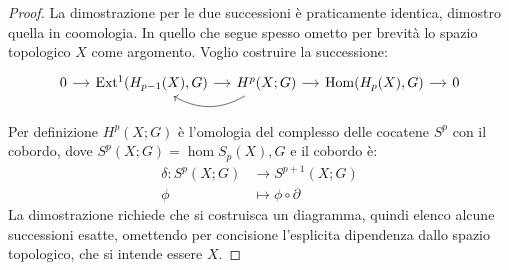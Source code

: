 \begin{proof}
  La dimostrazione per le due successioni è praticamente identica, dimostro
  quella in coomologia. In quello che segue spesso ometto per brevità lo spazio
  topologico $ X $ come argomento. Voglio costruire la successione:
  \[
    \begin{tikzcd}[nodes = {column sep = 12 pt}]
      0 \rar & \ext{H_{p-1}(X), G} \rar & \arrow[bend left]{l}{} H^p(X;G) \rar & \hom{H_p(X), G} \rar & 0
    \end{tikzcd}
  \]
  Per definizione $ H^p(X;G) $ è l'omologia del complesso delle cocatene $ S^p $ con il cobordo,
  dove $ S^p(X;G) = \hom{S_p(X), G} $ e il cobordo è:
  \begin{align*}
    \delta \colon S^p(X;G) & \to S^{p+1}(X;G) \\
    \phi & \mapsto \phi \circ \partial
  \end{align*}
  La dimostrazione richiede che si costruisca un diagramma, quindi elenco alcune
  successioni esatte, omettendo per concisione l'esplicita dipendenza dallo spazio
  topologico, che si intende essere $ X $.


\end{proof}

